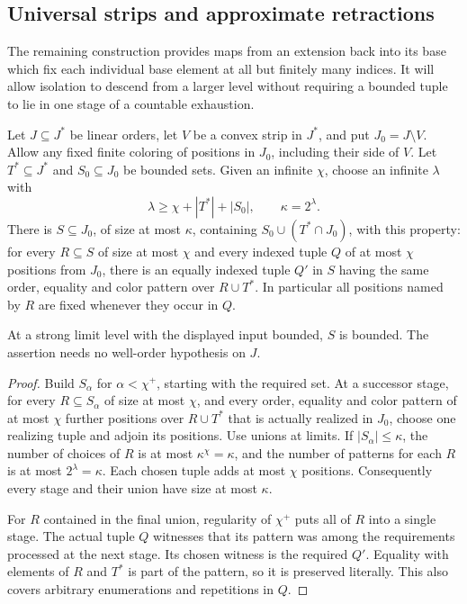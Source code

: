 \subsection{Universal strips and approximate retractions}

The remaining construction provides maps from an extension back into its
base which fix each individual base element at all but finitely many
indices.  It
will allow isolation to descend from a larger level without requiring a
bounded tuple to lie in one stage of a countable exhaustion.

\begin{lemma}
\label{calc:support-closure}
Let $J\subseteq J^*$ be linear orders, let $V$ be a convex strip in
$J^*$, and put $J_0=J\setminus V$.  Allow any fixed finite coloring
of positions in $J_0$, including their side of $V$.  Let
$T^*\subseteq J^*$ and $S_0\subseteq J_0$ be bounded sets.  Given
an infinite $\chi$, choose an infinite $\lambda$ with
\[
 \lambda\ge\chi+|T^*|+|S_0|,
 \qquad \kappa=2^\lambda.
\]
There is $S\subseteq J_0$, of size at most $\kappa$, containing
$S_0\cup(T^*\cap J_0)$, with this property: for every
$R\subseteq S$ of size at most $\chi$ and every indexed tuple $Q$
of at most $\chi$ positions from $J_0$, there is an equally indexed
tuple $Q'$ in $S$ having the same order, equality and color pattern
over $R\cup T^*$.  In particular all positions named by $R$ are
fixed whenever they occur in $Q$.

At a strong limit level with the displayed input bounded, $S$ is
bounded.  The assertion needs no well-order hypothesis on $J$.
\end{lemma}

\begin{proof}
Build $S_\alpha$ for $\alpha<\chi^+$, starting with the required
set.  At a successor stage, for every $R\subseteq S_\alpha$ of
size at most $\chi$, and every order, equality and color pattern of
at most $\chi$ further positions over $R\cup T^*$ that is actually
realized in $J_0$, choose one realizing tuple and adjoin its positions.
Use unions at limits.  If $|S_\alpha|\le\kappa$, the number of
choices of $R$ is at most $\kappa^\chi=\kappa$, and the number of
patterns for each $R$ is at most $2^\lambda=\kappa$.  Each chosen
tuple adds at most $\chi$ positions.  Consequently every stage and
their union have size at most $\kappa$.

For $R$ contained in the final union, regularity of $\chi^+$ puts
all of $R$ into a single stage.  The actual tuple $Q$ witnesses that
its pattern was among the requirements processed at the next stage.
Its chosen witness is the required $Q'$.  Equality with elements of
$R$ and $T^*$ is part of the pattern, so it is preserved literally.
This also covers arbitrary enumerations and repetitions in $Q$.
\end{proof}

